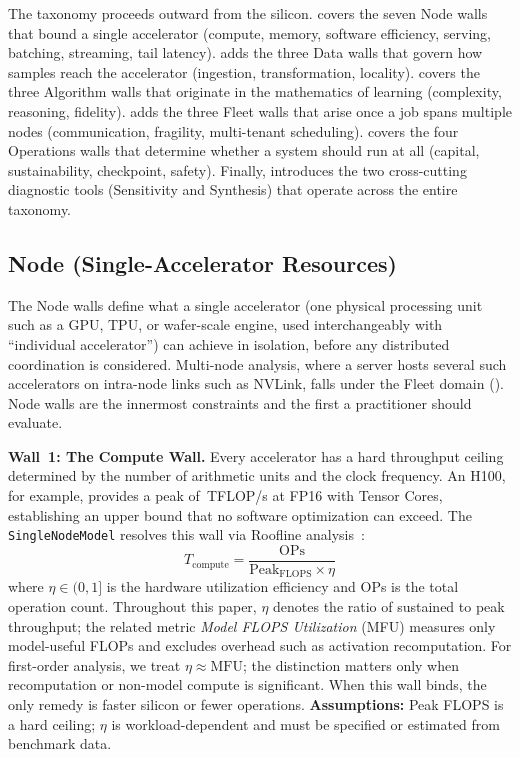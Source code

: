 \documentclass[10pt,twocolumn]{article}
\newcommand{\cvalint}[1]{\pgfmathprintnumber[fixed, precision=0, 1000 sep={\,}]{#1}}
\begin{document}
The taxonomy proceeds outward from the silicon.  covers the seven Node walls that bound a single accelerator (compute, memory, software efficiency, serving, batching, streaming, tail latency).  adds the three Data walls that govern how samples reach the accelerator (ingestion, transformation, locality).  covers the three Algorithm walls that originate in the mathematics of learning (complexity, reasoning, fidelity).  adds the three Fleet walls that arise once a job spans multiple nodes (communication, fragility, multi-tenant scheduling).  covers the four Operations walls that determine whether a system should run at all (capital, sustainability, checkpoint, safety). Finally,  introduces the two cross-cutting diagnostic tools (Sensitivity and Synthesis) that operate across the entire taxonomy.

\subsection{Node (Single-Accelerator Resources)}
\label{sec:walls-node}

The Node walls define what a single accelerator (one physical processing unit such as a GPU, TPU, or wafer-scale engine, used interchangeably with ``individual accelerator'') can achieve in isolation, before any distributed coordination is considered. Multi-node analysis, where a server hosts several such accelerators on intra-node links such as NVLink, falls under the Fleet domain (). Node walls are the innermost constraints and the first a practitioner should evaluate.

\textbf{Wall~1: The Compute Wall.} Every accelerator has a hard throughput ceiling determined by the number of arithmetic units and the clock frequency. An H100, for example, provides a peak of \cvalint{\HhPeakTFLOPS}\,TFLOP/s at FP16 with Tensor Cores, establishing an upper bound that no software optimization can exceed. The \texttt{SingleNodeModel} resolves this wall via Roofline analysis~\citep{williams2009}:
\begin{equation}
\label{eq:tcompute}
T_{\text{compute}} = \frac{\text{OPs}}{\text{Peak}_{\text{FLOPS}} \times \eta}
\end{equation}
where $\eta \in (0,1]$ is the hardware utilization efficiency and OPs is the total operation count. Throughout this paper, $\eta$ denotes the ratio of sustained to peak throughput; the related metric \emph{Model FLOPS Utilization} (MFU) measures only model-useful FLOPs and excludes overhead such as activation recomputation. For first-order analysis, we treat $\eta \approx \text{MFU}$; the distinction matters only when recomputation or non-model compute is significant. When this wall binds, the only remedy is faster silicon or fewer operations. \textbf{Assumptions:} Peak FLOPS is a hard ceiling; $\eta$ is workload-dependent and must be specified or estimated from benchmark data.
\end{document}
